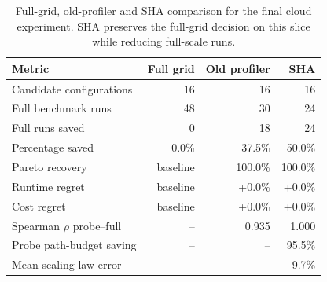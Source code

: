 \begin{table}[htbp]
\centering
\footnotesize
\setlength{\tabcolsep}{4pt}
\renewcommand{\arraystretch}{1.08}
\caption{Full-grid, old-profiler and SHA comparison for the final  cloud experiment. SHA preserves the full-grid decision on this slice while reducing full-scale runs.}
\label{tab:profiler-comparison}
\begin{tabularx}{\textwidth}{Yrrr}
\toprule
\textbf{Metric} & \textbf{Full grid} & \textbf{Old profiler} & \textbf{SHA} \\
\midrule
Candidate configurations & 16 & 16 & 16 \\
Full benchmark runs & 48 & 30 & 24 \\
Full runs saved & 0 & 18 & 24 \\
Percentage saved & 0.0\% & 37.5\% & 50.0\% \\
Pareto recovery & baseline & 100.0\% & 100.0\% \\
Runtime regret & baseline & +0.0\% & +0.0\% \\
Cost regret & baseline & +0.0\% & +0.0\% \\
Spearman $\rho$ probe--full & -- & 0.935 & 1.000 \\
Probe path-budget saving & -- & -- & 95.5\% \\
Mean scaling-law error & -- & -- & 9.7\% \\
\bottomrule
\end{tabularx}
\end{table}
